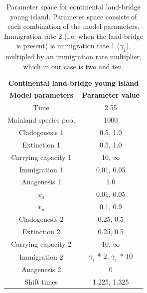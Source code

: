 \begin{table}[ht]
    \centering
    \caption{Parameter space for continental land-bridge young island. Parameter space consists of each combination of the model parameters. Immigration rate 2 (i.e. when the land-bridge is present) is immigration rate 1 ($\gamma_1$), multipled by an immigration rate multiplier, which in our case is two and ten.}
    \begin{tabular}{ c | c }
        \multicolumn{2}{c}{\textbf{Continental land-bridge young island}} \\
        \textbf{Model parameters} & \textbf{Parameter value} \\ 
        \hline
        \hline
        Time & 2.55 \\
        \hline
        Mainland species pool & 1000 \\
        \hline
        Cladogenesis 1 & 0.5, 1.0 \\
        \hline
        Extinction 1 & 0.5, 1.0 \\
        \hline
        Carrying capacity 1 & 10, $\infty$ \\
        \hline
        Immigration 1 & 0.01, 0.05 \\
        \hline
        Anagenesis 1 & 1.0 \\
        \hline
        $x_s$ & 0.01, 0.05 \\
        \hline
        $x_n$ & 0.1, 0.9 \\
        \hline
        Cladogenesis 2 & 0.25, 0.5 \\
        \hline
        Extinction 2 & 0.25, 0.5 \\
        \hline
        Carrying capacity 2 & 10, $\infty$ \\
        \hline
        Immigration 2 & $\gamma_1$ * 2, $\gamma_1$ * 10 \\ 
        \hline 
        Anagenesis 2 & 0 \\
        \hline
        Shift times & 1.225, 1.325 \\
    \end{tabular}
    \label{tab:continental_lb_young}
\end{table}

